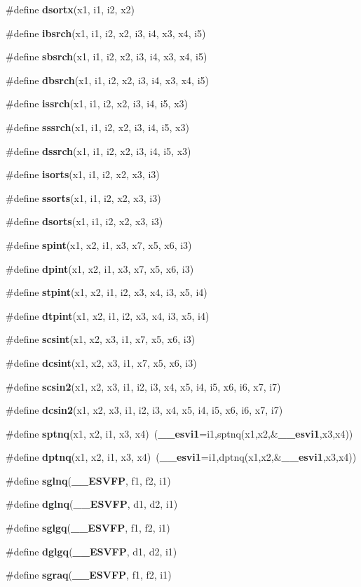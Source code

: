 \begin{CompactItemize}
\#define {\bf dsortx}(x1, i1, i2, x2)
\item 
\#define {\bf ibsrch}(x1, i1, i2, x2, i3, i4, x3, x4, i5)
\item 
\#define {\bf sbsrch}(x1, i1, i2, x2, i3, i4, x3, x4, i5)
\item 
\#define {\bf dbsrch}(x1, i1, i2, x2, i3, i4, x3, x4, i5)
\item 
\#define {\bf issrch}(x1, i1, i2, x2, i3, i4, i5, x3)
\item 
\#define {\bf sssrch}(x1, i1, i2, x2, i3, i4, i5, x3)
\item 
\#define {\bf dssrch}(x1, i1, i2, x2, i3, i4, i5, x3)
\item 
\#define {\bf isorts}(x1, i1, i2, x2, x3, i3)
\item 
\#define {\bf ssorts}(x1, i1, i2, x2, x3, i3)
\item 
\#define {\bf dsorts}(x1, i1, i2, x2, x3, i3)
\item 
\#define {\bf spint}(x1, x2, i1, x3, x7, x5, x6, i3)
\item 
\#define {\bf dpint}(x1, x2, i1, x3, x7, x5, x6, i3)
\item 
\#define {\bf stpint}(x1, x2, i1, i2, x3, x4, i3, x5, i4)
\item 
\#define {\bf dtpint}(x1, x2, i1, i2, x3, x4, i3, x5, i4)
\item 
\#define {\bf scsint}(x1, x2, x3, i1, x7, x5, x6, i3)
\item 
\#define {\bf dcsint}(x1, x2, x3, i1, x7, x5, x6, i3)
\item 
\#define {\bf scsin2}(x1, x2, x3, i1, i2, i3, x4, x5, i4, i5, x6, i6, x7, i7)
\item 
\#define {\bf dcsin2}(x1, x2, x3, i1, i2, i3, x4, x5, i4, i5, x6, i6, x7, i7)
\item 
\#define {\bf sptnq}(x1, x2, i1, x3, x4)~({\bf \_\-\_\-esvi1}=i1,sptnq(x1,x2,\&{\bf \_\-\_\-esvi1},x3,x4))
\item 
\#define {\bf dptnq}(x1, x2, i1, x3, x4)~({\bf \_\-\_\-esvi1}=i1,dptnq(x1,x2,\&{\bf \_\-\_\-esvi1},x3,x4))
\item 
\#define {\bf sglnq}({\bf \_\-\_\-ESVFP}, f1, f2, i1)
\item 
\#define {\bf dglnq}({\bf \_\-\_\-ESVFP}, d1, d2, i1)
\item 
\#define {\bf sglgq}({\bf \_\-\_\-ESVFP}, f1, f2, i1)
\item 
\#define {\bf dglgq}({\bf \_\-\_\-ESVFP}, d1, d2, i1)
\item 
\#define {\bf sgraq}({\bf \_\-\_\-ESVFP}, f1, f2, i1)

\end{CompactItemize}
